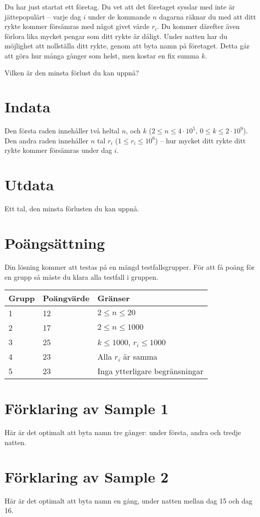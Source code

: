 Du har just startat ett företag.
Du vet att det företaget sysslar med inte är jättepopulärt --
varje dag $i$ under de kommande $n$ dagarna räknar du med att ditt rykte kommer försämras med något givet värde $r_i$.
Du kommer därefter även förlora lika mycket pengar som ditt rykte är dåligt.
Under natten har du möjlighet att nollställa ditt rykte, genom att byta namn på företaget.
Detta går att göra hur många gånger som helst, men kostar en fix summa $k$.

Vilken är den minsta förlust du kan uppnå?

\section*{Indata}
Den första raden innehåller två heltal $n$, och $k$ ($2 \leq n \leq 4 \cdot 10^5$, $0 \leq k \leq 2 \cdot 10^9$).
Den andra raden innehåller $n$ tal $r_i$ ($1 \le r_i \le 10^6$) -- hur mycket ditt rykte ditt rykte kommer försämras under dag $i$.

\section*{Utdata}
Ett tal, den minsta förlusten du kan uppnå.

\section*{Poängsättning}
Din lösning kommer att testas på en mängd testfallsgrupper. För att få poäng för en grupp så måste du klara alla testfall i gruppen.

\noindent
\begin{tabular}{| l | l | l |}
\hline
Grupp & Poängvärde & Gränser \\ \hline
1     & 12         & $2 \le n \le 20$ \\ \hline
2     & 17         & $2 \le n \le 1000$ \\ \hline
3     & 25         & $k \le 1000$, $r_i \le 1000$ \\ \hline
4     & 23         & Alla $r_i$ är samma \\ \hline
5     & 23         & Inga ytterligare begränsningar \\ \hline
\end{tabular}

\section*{Förklaring av Sample 1}
Här är det optimalt att byta namn tre gånger: under första, andra och tredje natten.

\section*{Förklaring av Sample 2}
Här är det optimalt att byta namn en gång, under natten mellan dag 15 och dag 16.
